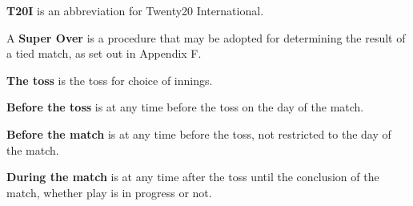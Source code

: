 \documentclass[12pt]{article}
\begin{document}
\vspace{\baselineskip}
{\fontsize{9pt}{10.8pt} \tabto{0.39in} {\fontsize{8pt}{9.6pt}\selectfont \textbf{T20I }is an abbreviation for Twenty20 International.\par}\par}\par


\vspace{\baselineskip}
\begin{adjustwidth}{0.4in}{0.29in}
{\fontsize{9pt}{10.8pt} \tabto{0.39in} A \textbf{Super Over} is a procedure that may be adopted for determining the result of a tied match, as set out in Appendix F.\par}\par

\end{adjustwidth}


\vspace{\baselineskip}
{\fontsize{9pt}{10.8pt} \tabto{0.39in} {\fontsize{8pt}{9.6pt}\selectfont \textbf{The toss }is the toss for choice of innings.\par}\par}\par


\vspace{\baselineskip}
{\fontsize{9pt}{10.8pt} \tabto{0.39in} {\fontsize{8pt}{9.6pt}\selectfont \textbf{Before the toss }is at any time before the toss on the day of the match.\par}\par}\par


\vspace{\baselineskip}
{\fontsize{9pt}{10.8pt} \tabto{0.39in} \textbf{Before the match }is at any time before the toss, not restricted to the day of the match.\par}\par


\vspace{\baselineskip}
\begin{adjustwidth}{0.4in}{0.01in}
{\fontsize{9pt}{10.8pt} \tabto{0.39in} \textbf{During the match }is at any time after the toss until the conclusion of the match, whether play is in progress or\textbf{ }not.\par}\par

\end{adjustwidth}
\end{document}
